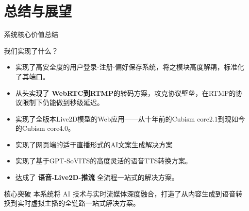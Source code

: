 \documentclass{beamer}
\begin{document}
\section{总结与展望}
\begin{frame}{系统核心价值总结}
    \begin{block}{我们实现了什么？}
        \begin{itemize}
            \item<1-> 实现了高安全度的用户登录-注册-偏好保存系统，将之模块高度解耦，标准化了其端口。
            \item<2-> 从头实现了 \textbf{WebRTC到RTMP}的转码方案，攻克协议壁垒，在RTMP的协议限制下仍能做到秒级延迟。
            \item<3-> 实现了全版本Live2D模型的Web应用——从十年前的Cubism core2.1到现如今的Cubism core4.0。
            \item<4-> 实现了网页端的适于直播形式的AI文案生成解决方案
            \item<5-> 实现了基于GPT-SoVITS的高度灵活的语音TTS转换方案。
            \item<6-> 达成了 \textbf{语音-Live2D-推流} 全流程一站式的解决方案。
        \end{itemize}
    \end{block}
    \begin{alertblock}{核心突破}
        本系统将 AI 技术与实时流媒体深度融合，打造了从内容生成到语音转换到实时虚拟主播的全链路一站式解决方案。
    \end{alertblock}
\end{frame}
\end{document}
